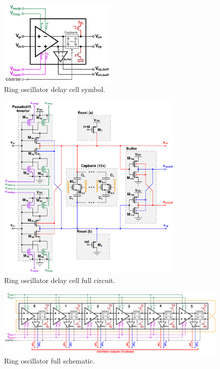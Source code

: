 			\begin{figure}[htb!]
			        \centering
			        \includegraphics[width=0.5\textwidth, angle=0]{./figs/design/delay_cell_symbol_full}
			    \caption{Ring oscillator delay cell symbol.}
			    \label{fig:delay_cell_symbol}
			\end{figure}

			\begin{figure}[htb!]
			        \centering
			        \includegraphics[width=0.8\textwidth, angle=0]{./figs/design/delay_cell_full}
			    \caption{Ring oscillator delay cell full circuit.}
			    \label{fig:delay_cell_circuit}
			\end{figure}
			\begin{figure}[htb!]
			        \centering
			        \includegraphics[width=1.5\textwidth, angle=90]{./figs/design/rosc_full_6stg}
			    \caption{Ring oscillator full schematic.}
			    \label{fig:full_6sg_ro}
			\end{figure}


